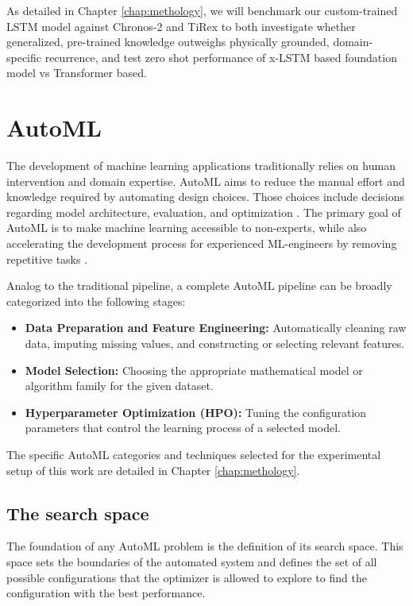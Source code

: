     
    As detailed in Chapter \ref{chap:methology}, we will benchmark our custom-trained \ac{LSTM} model against Chronos-2 and TiRex to both investigate whether generalized, pre-trained knowledge outweighs physically grounded, domain-specific recurrence, and test zero shot performance of \ac{x-LSTM} based foundation model vs Transformer based.
    

\section{AutoML}


The development of machine learning applications traditionally relies on human intervention and domain expertise. \ac{AutoML} aims to reduce the manual effort and knowledge required by automating design choices. Those choices include decisions regarding model architecture, evaluation, and optimization \parencite{hutter2019automated}. The primary goal of \ac{AutoML} is to make machine learning accessible to non-experts, while also accelerating the development process for experienced ML-engineers by removing repetitive tasks \parencite{AutoMLHoos, hutter2019automated}.

Analog to the traditional pipeline, a complete \ac{AutoML} pipeline can be broadly categorized into the following stages:
\begin{itemize}
    \item \textbf{Data Preparation and Feature Engineering:} Automatically cleaning raw data, imputing missing values, and constructing or selecting relevant features.
    \item \textbf{Model Selection:} Choosing the appropriate mathematical model or algorithm family for the given dataset.
    \item \textbf{Hyperparameter Optimization (HPO):} Tuning the configuration parameters that control the learning process of a selected model.
\end{itemize}
The specific \ac{AutoML} categories and techniques selected for the experimental setup of this work are detailed in Chapter \ref{chap:methology}.

\subsection{The search space}
The foundation of any \ac{AutoML} problem is the definition of its search space. This space sets the boundaries of the automated system and defines the set of all possible configurations that the optimizer is allowed to explore to find the configuration with the best performance.


